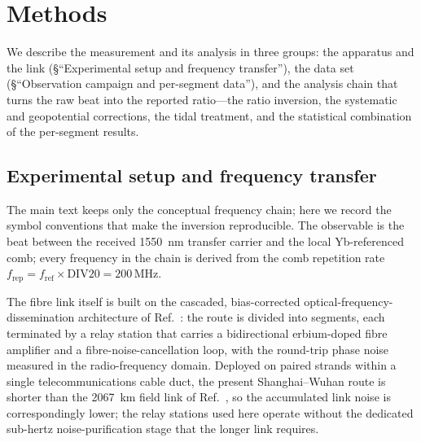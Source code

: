 \documentclass[11pt,a4paper]{article}
\begin{document}
\section{Methods}

We describe the measurement and its analysis in three groups: the
apparatus and the link (§``Experimental setup and frequency transfer''),
the data set (§``Observation campaign and per-segment data''), and the
analysis chain that turns the raw beat into the reported ratio---the
ratio inversion, the systematic and geopotential corrections, the tidal
treatment, and the statistical combination of the per-segment results.

\subsection{Experimental setup and frequency transfer}

The main text keeps only the conceptual frequency chain; here we record
the symbol conventions that make the inversion reproducible. The
observable is the beat between the received \qty{1550}{nm} transfer carrier
and the local Yb-referenced comb; every frequency in the chain is derived
from the comb repetition rate $f_{\mathrm{rep}} =
f_{\mathrm{ref}}\times\mathrm{DIV20} = 200$\,MHz.

The fibre link itself is built on the cascaded,
bias-corrected optical-frequency-dissemination architecture of
Ref.~\citep{chen2026dissemination}: the route is divided into segments,
each terminated by a relay station that carries a bidirectional
erbium-doped fibre amplifier and a fibre-noise-cancellation loop, with the
round-trip phase noise measured in the radio-frequency domain. Deployed
on paired strands within a single telecommunications cable duct, the
present Shanghai--Wuhan route is shorter than the \qty{2067}{km} field link of
Ref.~\citep{chen2026dissemination}, so the accumulated link noise is
correspondingly lower; the relay stations used here operate without the
dedicated sub-hertz noise-purification stage that the longer link
requires.
\end{document}
